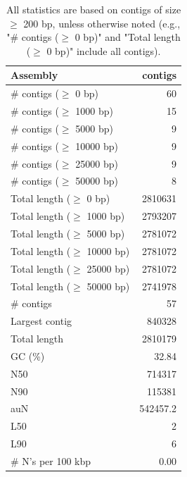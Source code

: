 \documentclass[12pt,a4paper]{article}
\begin{document}
\begin{table}[ht]
\begin{center}
\caption{All statistics are based on contigs of size $\geq$ 200 bp, unless otherwise noted (e.g., "\# contigs ($\geq$ 0 bp)" and "Total length ($\geq$ 0 bp)" include all contigs).}
\begin{tabular}{|l*{1}{|r}|}
\hline
Assembly & contigs \\ \hline
\# contigs ($\geq$ 0 bp) & 60 \\ \hline
\# contigs ($\geq$ 1000 bp) & 15 \\ \hline
\# contigs ($\geq$ 5000 bp) & 9 \\ \hline
\# contigs ($\geq$ 10000 bp) & 9 \\ \hline
\# contigs ($\geq$ 25000 bp) & 9 \\ \hline
\# contigs ($\geq$ 50000 bp) & 8 \\ \hline
Total length ($\geq$ 0 bp) & 2810631 \\ \hline
Total length ($\geq$ 1000 bp) & 2793207 \\ \hline
Total length ($\geq$ 5000 bp) & 2781072 \\ \hline
Total length ($\geq$ 10000 bp) & 2781072 \\ \hline
Total length ($\geq$ 25000 bp) & 2781072 \\ \hline
Total length ($\geq$ 50000 bp) & 2741978 \\ \hline
\# contigs & 57 \\ \hline
Largest contig & 840328 \\ \hline
Total length & 2810179 \\ \hline
GC (\%) & 32.84 \\ \hline
N50 & 714317 \\ \hline
N90 & 115381 \\ \hline
auN & 542457.2 \\ \hline
L50 & 2 \\ \hline
L90 & 6 \\ \hline
\# N's per 100 kbp & 0.00 \\ \hline
\end{tabular}
\end{center}
\end{table}
\end{document}
